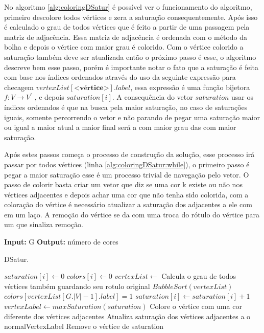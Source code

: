 \documentclass[12pt]{article}
\begin{document}
No algoritmo \ref{alg:coloringDSatur} é possível ver o funcionamento do algoritmo, primeiro descolore todos vértices e zera a saturação consequentemente. Após isso é calculado o grau de todos vértices que é feito a partir de uma passagem pela matriz de adjacência. Essa matriz de adjacência é ordenada com o método da bolha e depois o vértice com maior grau é colorido. Com o vértice colorido a saturação também deve ser atualizada então o próximo passo é esse, o algoritmo descreve bem esse passo, porém é importante notar o fato que a saturação é feita com base nos índices ordenados através do uso da seguinte expressão para checagem \(vertexList[\textbf{<vértice>}].label\), essa expressão é uma função bijetora \(f: V \rightarrow V^{'}\) , e depois \(saturation[i]\). A consequência do vetor \(saturation\) usar os índices ordenados é que na busca pela maior saturação, no caso de saturações iguais, somente percorrendo o vetor e não parando de pegar uma saturação maior ou igual a maior atual a maior final será a com maior grau das com maior saturação.

Após estes passos começa o processo de construção da solução, esse processo irá passar por todos vértices (linha \ref{alg:coloringDSatur:while}), o primeiro passo é pegar a maior saturação esse é um processo trivial de navegação pelo vetor. O passo de colorir basta criar um vetor que diz se uma cor k existe ou não nos vértices adjacentes e depois achar uma cor que não tenha sido colorida, com a coloração do vértice é necessário atualizar a saturação dos adjacentes a ele com em um laço. A remoção do vértice se da com uma troca do rótulo do vértice para um que sinaliza remoção.

\begin{algorithm}
\textbf{Input:} G
\textbf{Output:} número de cores
\caption{DSatur.}\label{alg:coloringDSatur}
\begin{algorithmic}[1]
   \State $saturation[i] \gets 0$
   \State $colors[i] \gets 0$
\EndFor
\State $vertexList \gets$ Calcula o grau de todos vértices também guardando seu rotulo original
\State $BubbleSort(vertexList)$
\State $colors[vertexList[G.|V|-1].label]=1$
   \State $saturation[i]\gets saturation[i]+1$
   \EndIf
\EndFor
{}\label{alg:coloringDSatur:while}
    \State $vertexLabel \gets maxSaturation(saturation)$
    \State Colore o vértice com uma cor diferente dos vértices adjacentes
    \State Atualiza saturação dos vértices adjacentes a o normalVertexLabel
    \State Remove o vértice de saturation
\EndWhile
\EndProcedure
\end{algorithmic}
\end{algorithm}
\end{document}
